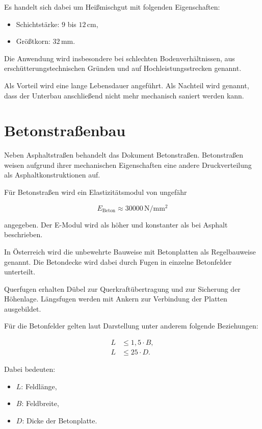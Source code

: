 \documentclass[
  12pt,
  a4paper,
  oneside
]{scrreprt}
\begin{document}
Es handelt sich dabei um Heißmischgut mit folgenden Eigenschaften:

\begin{itemize}
  \item Schichtstärke: $9$ bis $12\,\mathrm{cm}$,
  \item Größtkorn: $32\,\mathrm{mm}$.
\end{itemize}



Die Anwendung wird insbesondere bei schlechten Bodenverhältnissen, aus
erschütterungstechnischen Gründen und auf Hochleistungsstrecken
genannt.


Als Vorteil wird eine lange Lebensdauer angeführt. Als Nachteil wird
genannt, dass der Unterbau anschließend nicht mehr mechanisch saniert
werden kann.


\section{Betonstraßenbau}

Neben Asphaltstraßen behandelt das Dokument Betonstraßen. Betonstraßen
weisen aufgrund ihrer mechanischen Eigenschaften eine andere
Druckverteilung als Asphaltkonstruktionen auf.


Für Betonstraßen wird ein Elastizitätsmodul von ungefähr

\begin{equation}
  E_{\mathrm{Beton}}
  \approx
  30000\,\mathrm{N/mm^2}
\end{equation}

angegeben. Der E-Modul wird als höher und konstanter als bei Asphalt
beschrieben.


In Österreich wird die unbewehrte Bauweise mit Betonplatten als
Regelbauweise genannt. Die Betondecke wird dabei durch Fugen in
einzelne Betonfelder unterteilt.


Querfugen erhalten Dübel zur Querkraftübertragung und zur Sicherung der
Höhenlage. Längsfugen werden mit Ankern zur Verbindung der Platten
ausgebildet.


Für die Betonfelder gelten laut Darstellung unter anderem folgende
Beziehungen:

\begin{align}
  L &\leq 1{,}5 \cdot B, \\
  L &\leq 25 \cdot D.
\end{align}

Dabei bedeuten:

\begin{itemize}
  \item $L$: Feldlänge,
  \item $B$: Feldbreite,
  \item $D$: Dicke der Betonplatte.
\end{itemize}
\end{document}

